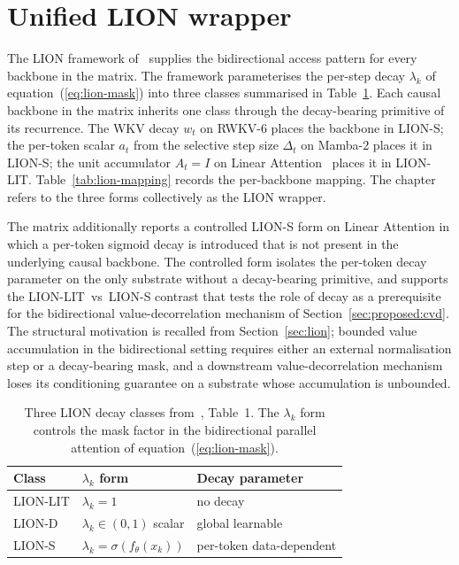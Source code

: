 \section{Unified LION wrapper}\label{sec:proposed:lion}

The LION framework of~\citet{afzal2025linear} supplies the
bidirectional access pattern for every backbone in the matrix.
The framework parameterises the per-step decay $\lambda_{k}$ of
equation~(\ref{eq:lion-mask}) into three classes summarised in
Table~\ref{tab:lion-variants}. Each causal backbone in the matrix
inherits one class through the decay-bearing primitive of its
recurrence. The WKV decay $w_{t}$ on RWKV-6 places the backbone
in LION-S; the per-token scalar $a_{t}$ from the selective step
size $\Delta_{t}$ on Mamba-2 places it in LION-S; the unit
accumulator $A_{t} = I$ on Linear
Attention~\cite{katharopoulos2020transformers} places it in
LION-LIT. Table~\ref{tab:lion-mapping} records the per-backbone
mapping. The chapter refers to the three forms collectively as
the LION wrapper.

The matrix additionally reports a controlled LION-S form on
Linear Attention in which a per-token sigmoid decay is introduced
that is not present in the underlying causal backbone. The
controlled form isolates the per-token decay parameter on the
only substrate without a decay-bearing primitive, and supports
the LION-LIT~vs~LION-S contrast that tests the role of decay as
a prerequisite for the bidirectional value-decorrelation
mechanism of Section~\ref{sec:proposed:cvd}. The structural
motivation is recalled from Section~\ref{sec:lion}; bounded value
accumulation in the bidirectional setting requires either an
external normalisation step or a decay-bearing mask, and a
downstream value-decorrelation mechanism loses its conditioning
guarantee on a substrate whose accumulation is unbounded.

\begin{table}[t]
\centering
\small
\caption[LION decay variants]{Three LION decay classes
from~\citet{afzal2025linear}, Table~1. The $\lambda_{k}$ form
controls the mask factor in the bidirectional parallel attention
of equation~(\ref{eq:lion-mask}).}
\label{tab:lion-variants}
\setlength{\tabcolsep}{6pt}
\renewcommand{\arraystretch}{1.25}
\begin{tabularx}{\linewidth}{@{}p{1.8cm} p{4.2cm} X@{}}
\toprule
\textbf{Class} & \textbf{$\lambda_{k}$ form} & \textbf{Decay parameter} \\
\midrule
LION-LIT & $\lambda_{k} = 1$                              & no decay \\
LION-D   & $\lambda_{k} \in (0, 1)$ scalar                & global learnable \\
LION-S   & $\lambda_{k} = \sigma(f_{\theta}(x_{k}))$      & per-token data-dependent \\
\bottomrule
\end{tabularx}
\end{table}


